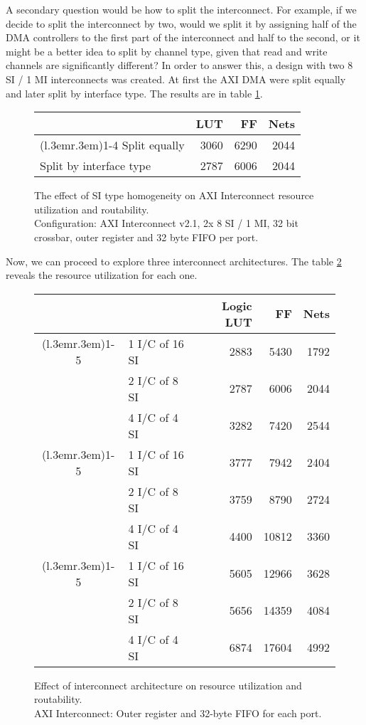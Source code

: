 A secondary question would be how to split the interconnect. 
For example, if we decide to split the interconnect by two, 
would we split it by assigning half of the DMA controllers to the first
part of the interconnect and half to the second, or it might be a better idea to split by
channel type, given that read and write channels are significantly different? 
In order to answer this, a design with two 8 SI / 1 MI interconnects was created.
At first the AXI DMA were split equally and later split by interface type.
The results are in table \ref{tab:int-mixed}.

\begin{figure}[ht!]
\centering
\begin{tabular}{lrrr}
\toprule
			& LUT	& FF	& Nets \\
\cmidrule(l{.3em}r{.3em}){1-4}
Split equally 		& 3060	&6290	&2044 	\\
Split by interface type	& 2787	&6006	& 2044	\\
\bottomrule
\end{tabular}
\caption{The effect of SI type homogeneity on AXI Interconnect resource utilization and routability.\\
	Configuration: AXI Interconnect v2.1, 2x 8 SI / 1 MI, 32 bit crossbar, 
	outer register and 32 byte FIFO per port.}
\label{tab:int-mixed}
\end{figure}

Now, we can proceed to explore three interconnect architectures.
The table \ref{tab:int-msi} reveals the resource utilization for each one.

\begin{figure}[ht!]
\centering
\begin{tabular}{cl rrr}
\toprule
&		&Logic LUT & FF	& Nets \\
\cmidrule(l{.3em}r{.3em}){1-5}
\multirow{3}{*}{\rotatebox{90}{32 bit}}			
&1 I/C of 16 SI	& 2883	& 5430	& 1792 	\\
&2 I/C of 8 SI	& 2787	& 6006	& 2044	\\
&4 I/C of 4 SI	& 3282	& 7420	& 2544	\\
\cmidrule(l{.3em}r{.3em}){1-5}
\multirow{3}{*}{\rotatebox{90}{64 bit}}
&1 I/C of 16 SI	& 3777	& 7942 	& 2404	\\
&2 I/C of 8 SI	& 3759	& 8790	& 2724	\\
&4 I/C of 4 SI	& 4400	&10812	& 3360	\\
\cmidrule(l{.3em}r{.3em}){1-5}
\multirow{3}{*}{\rotatebox{90}{128 bit}}
&1 I/C of 16 SI	& 5605	& 12966	& 3628	\\
&2 I/C of 8 SI	& 5656	& 14359	& 4084	\\
&4 I/C of 4 SI	& 6874	& 17604	& 4992	\\
\bottomrule
\end{tabular}
\caption{Effect of interconnect architecture on resource utilization and routability.\\
	AXI Interconnect: Outer register and 32-byte FIFO for each port.}
\label{tab:int-msi}
\end{figure}


